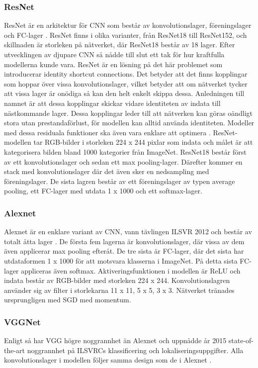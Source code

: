 \documentclass[]{kththesis}
\begin{document}
\subsubsection{ResNet}
ResNet är en arkitektur för CNN som består av konvolutionslager, föreningslager och FC-lager \parencite{he2016deep}. ResNet finns i olika varianter, från ResNet18 till ResNet152, och skillnaden är storleken på nätverket, där ResNet18 består av 18 lager. Efter utvecklingen av djupare CNN så nådde till slut ett tak för hur kraftfulla modellerna kunde vara. ResNet är en lösning på det här problemet som introducerar identity shortcut connections. Det betyder att det finns kopplingar som hoppar över vissa konvolutionslager, vilket betyder att om nätverket tycker att vissa lager är onödiga så kan den helt enkelt skippa dessa. Anledningen till namnet är att dessa kopplingar skickar vidare identiteten av indata till nästkommande lager. Dessa kopplingar leder till att nätverken kan göras oändligt stora utan prestandaförlust, för modellen kan alltid använda identiteten. Modeller med dessa residuala funktioner ska även vara enklare att optimera \parencite{he2016deep}. ResNet-modellen tar RGB-bilder i storleken 224 x 244 pixlar som indata och målet är att kategorisera bilden bland 1000 kategorier från ImageNet. ResNet18 består först av ett konvolutionslager och sedan ett max pooling-lager. Därefter kommer en stack med konvolutionslager där det även sker en nedsampling med föreningslager. De sista lagren består av ett föreningslager av typen average pooling, ett FC-lager med utdata 1 x 1000 och ett softmax-lager.

\subsubsection{Alexnet}
Alexnet är en enklare variant av CNN, vann tävlingen ILSVR 2012 och består av totalt åtta lager \parencite{krizhevsky2012imagenet}. De första fem lagerna är konvolutionslager, där vissa av dem även applicerar max pooling efteråt. De tre sista är FC-lager, där det sista har utdataformen 1 x 1000 för att motsvara klasserna i ImageNet. På detta sista FC-lager appliceras även softmax. Aktiveringsfunktionen i modellen är ReLU och indata består av RGB-bilder med storleken 224 x 244. Konvolutionslagren använder sig av filter i storlekarna 11 x 11, 5 x 5, 3 x 3. Nätverket tränades ursprungligen med SGD med momentum.

\subsubsection{VGGNet}
Enligt \cite{simonyan2014very} så har VGG högre noggrannhet än Alexnet och uppnådde år 2015 state-of-the-art noggrannhet på ILSVRCs klassificering och lokaliseringsuppgifter. Alla konvolutionslager i modellen följer samma design som de i Alexnet \parencite{simonyan2014very}. 
\end{document}
